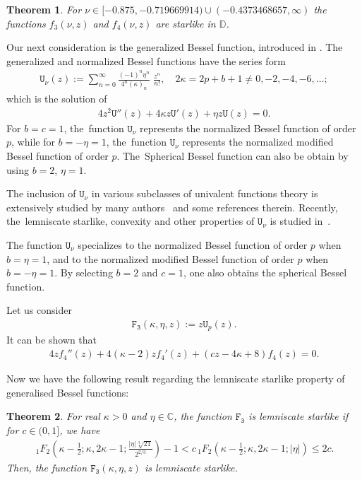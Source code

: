 \documentclass[a4paper,11pt,reqno]{amsart}
\newtheorem{theorem}{Theorem}[section]
\begin{document}
\begin{theorem}\cite{Baricz-Ponnusamy-2010}\label{thmA}
For \( \nu \in [-0.875, -0.719669914) \cup (-0.4373468657, \infty) \) the functions \(  f_3(\nu, z) \) and \(  f_4(\nu, z) \) are starlike in $\mathbb{D}$. 
\end{theorem}
Our next consideration is the generalized Bessel function, introduced in \cite{Baricz1,Baricz3}.  The generalized and normalized Bessel functions have the series form
	\begin{align*}
		\mathtt{U}_{\nu}(z) := \sum_{n=0}^\infty \frac{(-1)^n \eta^n}{4^n (\kappa)_n} \; \frac{z^n}{n!}, \quad  2 \kappa = 2 p+ b+1 \neq 0, -2, -4, -6, \ldots;
	\end{align*}
	which is the solution of
	\begin{align}\label{Bessel-gen-DE}
		4 z^2 \mathtt{U''}(z)+ 4 \kappa z \mathtt{U'}(z)+ \eta z \mathtt{U}(z)=0.
	\end{align}
	{For} $b=c=1$, the~function $\mathtt{U}_{\nu}$ represents the normalized Bessel function of order $p$, while for  $b=- \eta =1$, the~function $\mathtt{U}_{\nu}$ represents the normalized modified Bessel function of order $p$. The~Spherical Bessel function can also be obtain by using $b=2$, $\eta=1$.
	
	The inclusion of $\mathtt{U}_{\nu}$ in various subclasses of univalent functions theory is extensively studied  by many authors~\cite{Kanas-saiful,Madan-Kumar-Ravi-Hungar,saiful-Dhuian,saiful-swami,Baricz3,Baricz-Pswamy,Baricz-Szasz,Baricz1,Baricz2} and some references therein. Recently, the~lemniscate starlike, convexity and other properties of $\mathtt{U}_{\nu}$ is studied in~\cite{Madan-Kumar-Ravi-Hungar,Lemniscate,Zayed-Lem-Bessel}.

   The function $\mathtt{U}_{\nu}$ specializes to the normalized Bessel function of order $p$ when $b=\eta=1$, and to the normalized modified Bessel function of order $p$ when $b=-\eta=1$. By selecting $b=2$ and $c=1$, one also obtains the spherical Bessel function.    

	Let us consider
	\begin{align*}
		\mathtt{F_3}(\kappa, \eta, z):= z \mathtt{U}_p(z).
	\end{align*}
	It can be shown that 
	\begin{align}
		4 z f_4''(z)+ 4(\kappa-2) z f_4'(z)+ (cz- 4 \kappa+8)f_4(z)=0.
	\end{align}

Now we have the following result regarding the lemniscate starlike property of generalised Bessel functions: 
\begin{theorem}\label{thm-GBessel}
    For real $\kappa>0$ and $\eta \in \mathbb{C}$, the function $\mathtt{F_3}$ is lemniscate starlike if for $c \in (0, 1]$, we have
    \begin{align}\label{en:hypo-1-thm-Bessel}
       \, _1F_2\left(\kappa -\frac{1}{2};\kappa ,2 \kappa -1;\frac{|\eta|\sqrt[3]{21}}{2^{2/3}}\right)-1<c\, _1F_2\left(\kappa -\frac{1}{2};\kappa ,2 \kappa -1; |\eta|\right) \le 2 c.
    \end{align} 
    Then, the function $\mathtt{F_3}(\kappa, \eta, z)$ is lemniscate starlike. 
\end{theorem}
\end{document}
